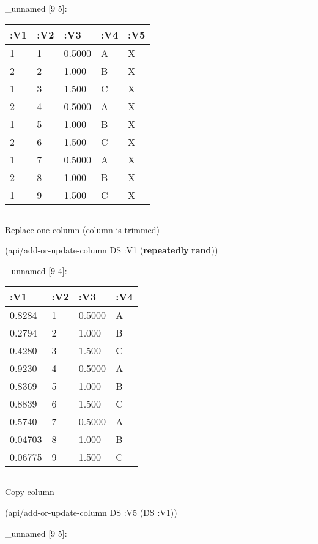 \documentclass[]{article}
\newenvironment{Shaded}{\begin{snugshade}}{\end{snugshade}}
\newcommand{\KeywordTok}[1]{\textcolor[rgb]{0.13,0.29,0.53}{\textbf{#1}}}
\newcommand{\AttributeTok}[1]{\textcolor[rgb]{0.77,0.63,0.00}{#1}}
\newcommand{\NormalTok}[1]{#1}
\begin{document}
\_unnamed {[}9 5{]}:

\begin{longtable}[]{@{}lllll@{}}
\toprule
:V1 & :V2 & :V3 & :V4 & :V5\tabularnewline
\midrule
\endhead
1 & 1 & 0.5000 & A & X\tabularnewline
2 & 2 & 1.000 & B & X\tabularnewline
1 & 3 & 1.500 & C & X\tabularnewline
2 & 4 & 0.5000 & A & X\tabularnewline
1 & 5 & 1.000 & B & X\tabularnewline
2 & 6 & 1.500 & C & X\tabularnewline
1 & 7 & 0.5000 & A & X\tabularnewline
2 & 8 & 1.000 & B & X\tabularnewline
1 & 9 & 1.500 & C & X\tabularnewline
\bottomrule
\end{longtable}

\begin{center}\rule{0.5\linewidth}{0.5pt}\end{center}

Replace one column (column is trimmed)

\begin{Shaded}
\begin{Highlighting}[]
\NormalTok{(api/add-or-update-column DS }\AttributeTok{:V1}\NormalTok{ (}\KeywordTok{repeatedly} \KeywordTok{rand}\NormalTok{))}
\end{Highlighting}
\end{Shaded}

\_unnamed {[}9 4{]}:

\begin{longtable}[]{@{}llll@{}}
\toprule
:V1 & :V2 & :V3 & :V4\tabularnewline
\midrule
\endhead
0.8284 & 1 & 0.5000 & A\tabularnewline
0.2794 & 2 & 1.000 & B\tabularnewline
0.4280 & 3 & 1.500 & C\tabularnewline
0.9230 & 4 & 0.5000 & A\tabularnewline
0.8369 & 5 & 1.000 & B\tabularnewline
0.8839 & 6 & 1.500 & C\tabularnewline
0.5740 & 7 & 0.5000 & A\tabularnewline
0.04703 & 8 & 1.000 & B\tabularnewline
0.06775 & 9 & 1.500 & C\tabularnewline
\bottomrule
\end{longtable}

\begin{center}\rule{0.5\linewidth}{0.5pt}\end{center}

Copy column

\begin{Shaded}
\begin{Highlighting}[]
\NormalTok{(api/add-or-update-column DS }\AttributeTok{:V5}\NormalTok{ (DS }\AttributeTok{:V1}\NormalTok{))}
\end{Highlighting}
\end{Shaded}

\_unnamed {[}9 5{]}:
\end{document}
